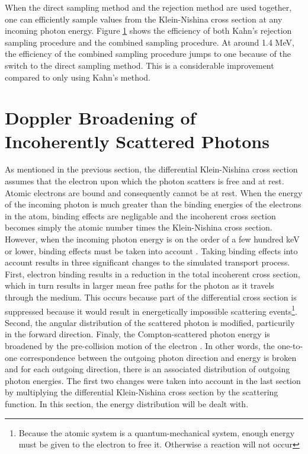 When the direct sampling method and the rejection method are used together, one 
can efficiently sample values from the Klein-Nishina cross section at any 
incoming photon energy. Figure \ref{} shows the efficiency of both Kahn's 
rejection sampling procedure and the combined sampling procedure. At around
1.4 MeV, the efficiency of the combined sampling procedure jumps to one because
of the switch to the direct sampling method. This is a considerable improvement
compared to only using Kahn's method. 

\section{Doppler Broadening of Incoherently Scattered Photons}
As mentioned in the previous section, the differential Klein-Nishina cross 
section assumes that the electron upon which the photon scatters is free
and at rest. Atomic electrons are bound and consequently cannot be at rest. 
When the energy of the incoming photon is much greater than the binding 
energies of the electrons in the atom, binding effects are negligable and the
incoherent cross section becomes simply the atomic number times the 
Klein-Nishina cross section. However, when the incoming photon energy is on the
order of a few hundred keV or lower, binding effects must be taken into account
\citep{namito_implementation_1994}. Taking binding effects into account results
in three significant changes to the simulated transport process. First, electron
binding results in a reduction in the total incoherent cross section, which
in turn results in larger mean free paths for the photon as it travels through
the medium. This occurs because part of the differential cross section is
suppressed because it would result in energetically impossible scattering 
events\footnote{Because the atomic system is a quantum-mechanical system, enough
energy must be given to the electron to free it. Otherwise a reaction will not
occur}. Second, the angular distribution of the scattered photon is 
modified, particurily in the forward direction. Finaly, the Compton-scattered
photon energy is broadened by the pre-collision motion of the electron 
\citep{namito_implementation_1994}. In other words, the one-to-one 
correspondence between the outgoing photon direction and energy is broken and 
for each outgoing direction, there is an associated distribution of outgoing 
photon energies. The first two changes were taken into account in the last
section by multiplying the differential Klein-Nishina cross section by the 
scattering function. In this section, the energy distribution will be dealt
with. 

